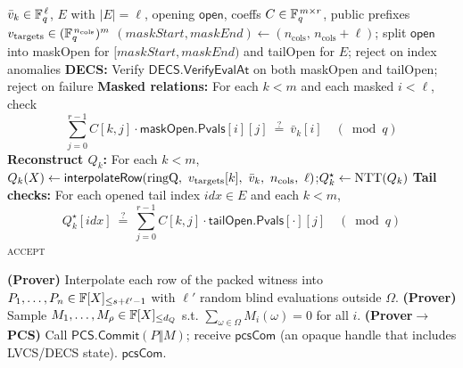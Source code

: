 \begin{algorithm}[H]
\caption{\textsf{LVCS.EvalStep2}$(\{\bar v_k\}_{k<m},\ E,\ \mathsf{open},\ C,\ v_{{\rm targets}})\to \{\textsc{accept},\textsc{reject}\}$ \quad \emph{(Verifier)}}
\begin{algorithmic}[1]
\Require $\bar v_k\in\mathbb{F}_q^{\,\ell}$, $E$ with $|E|=\ell$, opening $\mathsf{open}$, coeffs $C\in\mathbb{F}_q^{\,m\times r}$, public prefixes $v_{{\rm targets}}\in(\mathbb{F}_q^{\,n_{\mathrm{cols}}})^{m}$
\State $(maskStart,maskEnd)\gets(n_{\mathrm{cols}},\,n_{\mathrm{cols}}+\ell)$;\; split $\mathsf{open}$ into \textsf{maskOpen} for $[maskStart,maskEnd)$ and \textsf{tailOpen} for $E$;\; reject on index anomalies
\State \textbf{DECS:} Verify $\textsf{DECS.VerifyEvalAt}$ on both \textsf{maskOpen} and \textsf{tailOpen}; reject on failure
\State \textbf{Masked relations:} For each $k<m$ and each masked $i<\ell$, check
\[
    \sum_{j=0}^{r-1} C[k,j]\cdot \mathsf{maskOpen.Pvals}[i][j]\ \stackrel{?}{=}\ \bar v_k[i]\quad(\bmod q)
\]
\State \textbf{Reconstruct $Q_k$:} For each $k<m$,
\Statex \quad $Q_k(X)\gets \textsf{interpolateRow}(\mathrm{ringQ},\ v_{{\rm targets}}[k],\ \bar v_k,\ n_{\mathrm{cols}},\ \ell)$;\quad $Q_k^\star\gets \mathrm{NTT}(Q_k)$
\State \textbf{Tail checks:} For each opened tail index $idx\in E$ and each $k<m$,
\[
    Q_k^\star[idx]\ \stackrel{?}{=}\ \sum_{j=0}^{r-1} C[k,j]\cdot \mathsf{tailOpen.Pvals}[\cdot][j]\quad(\bmod q)
\]
\State \Return \textsc{accept}
\end{algorithmic}
\end{algorithm}

\begin{algorithm}[H]
\caption{\textsf{PACS.PIOPCommitOracle}\(_\text{Prover}(\textsf{params})\to \textsf{pcsCom}\)}
\begin{algorithmic}[1]
\State \textbf{(Prover)} Interpolate each row of the packed witness into \(P_1,\ldots,P_n\in\mathbb{F}[X]_{\le s+\ell'-1}\) with \(\ell'\) random blind evaluations outside \(\Omega\). 
\State \textbf{(Prover)} Sample \(M_1,\ldots,M_\rho\in\mathbb{F}[X]_{\le d_Q}\) s.t. \(\sum_{\omega\in\Omega}M_i(\omega)=0\) for all \(i\). 
\State \textbf{(Prover\(\rightarrow\)PCS)} Call \(\textsf{PCS.Commit}(P\Vert M)\); receive \(\textsf{pcsCom}\) (an opaque handle that includes LVCS/DECS state).
\State \Return \(\textsf{pcsCom}\).
\end{algorithmic}
\end{algorithm}

